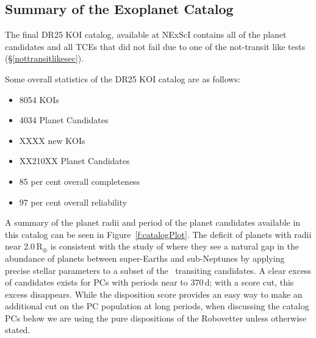 \subsection{Summary of the Exoplanet Catalog}

The final DR25 KOI catalog, available at NExScI contains all of the planet candidates and all TCEs that did not fail due to one of the not-transit like tests (\S\ref{nottransitlikesec}). 


Some overall statistics of the DR25 KOI catalog are as follows:
\begin{itemize}
    \item 8054 KOIs
    \item 4034 Planet Candidates
    \item XXXX new KOIs
    \item XX210XX Planet Candidates
    \item 85 per cent overall completeness
    \item 97 per cent overall reliability
\end{itemize}


A summary of the planet radii and period of the planet candidates available in this catalog can be seen in Figure~\ref{f:catalogPlot}. The deficit of planets with radii near 2.0\,R$_{\oplus}$ is consistent with the study of \citet{Fulton2017} where they see a natural gap in the abundance of planets between super-Earths and sub-Neptunes by applying precise stellar parameters to a subset of the \kepler\ transiting candidates. A clear excess of candidates exists for PCs with periods near to 370\,d;  with a score cut, this excess disappears. While the disposition score provides an easy way to make an additional cut on the PC population at long periods, when discussing the catalog PCs below we are using the pure dispositions of the Robovetter unless otherwise stated. 

